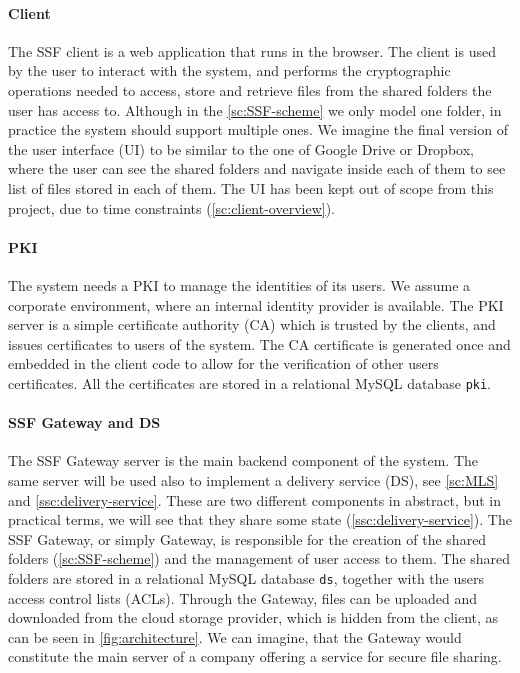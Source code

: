 \paragraph{Client} The SSF client is a web application that
runs in the browser. The client is used by the user to
interact with the system, and performs the cryptographic
operations needed to access, store and retrieve files 
from the shared folders the user has access to.
Although in the \cref{sc:SSF-scheme} we only model one folder,
in practice the system should support multiple ones.
We imagine the final version of the user interface (UI) to
be similar to the one of Google Drive or Dropbox, where
the user can see the shared folders and navigate inside each
of them to see list of files stored in each of them.
The UI has been kept out of scope from this project, due to
time constraints (\cref{sc:client-overview}).

\paragraph{PKI} The system needs a PKI to manage the identities
of its users. We assume a corporate environment, where
an internal identity provider is available. The PKI server
is a simple certificate authority (CA) which is trusted
by the clients, and issues certificates to users of the system.
The CA certificate is generated once and embedded in the client
code to allow for the verification of other users certificates.
All the certificates are stored in a relational MySQL database \texttt{pki}.

\paragraph{SSF Gateway and DS}
The SSF Gateway server is the main backend component of the system.
The same server will be used also to implement a delivery service (DS), see \cref{sc:MLS} and \cref{ssc:delivery-service}.
These are two different components in abstract, but in practical terms, 
we will see that they share some state (\cref{ssc:delivery-service}).
The SSF Gateway, or simply Gateway, is responsible for the
creation of the shared folders (\cref{sc:SSF-scheme}) and the management of user access
to them. The shared folders are stored in a relational MySQL
database \texttt{ds}, together with the users access control lists (ACLs).
Through the Gateway, files can be uploaded and downloaded 
from the cloud storage provider, which is hidden from the client,
as can be seen in \cref{fig:architecture}.
We can imagine, that the Gateway would constitute the main
server of a company offering a service for secure file sharing.

